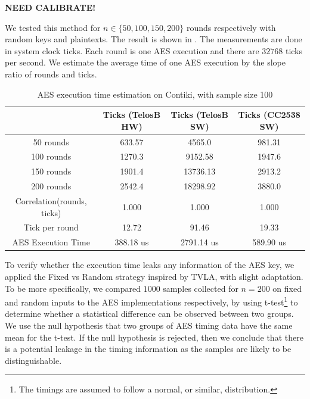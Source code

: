 \textbf{NEED CALIBRATE!}


We tested this method for  $n \in \{ 50, 100, 150, 200\}$ rounds respectively with random keys and plaintexts. The result is shown in . The measurements are done in system clock ticks. Each round is one AES execution and there are $32768$ ticks per second. We estimate the average time of one AES execution by the slope ratio of rounds and ticks.

\begin{table}[ht!]
	\center
	\begin{tabular}{|c|c|c|c|}
	\hline
	                               & Ticks (TelosB HW) & Ticks (TelosB SW) & Ticks (CC2538 SW) \\ \hline
	50 rounds                      & 633.57                  & 4565.0                  & 981.31                  \\ \hline
	100 rounds                     & 1270.3                  & 9152.58                 & 1947.6                  \\ \hline
	150 rounds                     & 1901.4                  & 13736.13                & 2913.2                  \\ \hline
	200 rounds                     & 2542.4                  & 18298.92                & 3880.0                  \\ \hline
	Correlation(rounds, ticks)     & 1.000                   & 1.000                   & 1.000                   \\ \hline
        Tick per round & 12.72                   & 91.46                   & 19.33                   \\ \hline
	AES Execution Time   & 388.18 us               & 2791.14 us              & 589.90 us               \\ \hline
	\end{tabular}
	\caption{AES execution time estimation on Contiki, with sample size 100}
	\label{Tbl: AES execution time estimation of Contiki}
\end{table}

To verify whether the execution time leaks any information of the AES key, we applied the Fixed vs Random strategy inspired by TVLA\cite{TVLA}, with slight adaptation. To be more specifically, we compared $1000$ samples collected for $n=200$ on fixed and random inputs to the AES implementations respectively, by using t-test\footnote{The timings are assumed to follow a normal, or similar, distribution.} to determine whether a statistical difference can be observed  between two groups. We use the null hypothesis that two groups of AES timing data have the same mean for the t-test. If the null hypothesis is rejected, then we conclude that there is a potential leakage in the timing information as the samples are likely to be distinguishable. 

